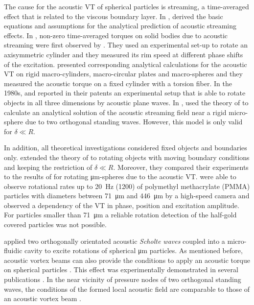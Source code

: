 The cause for the acoustic VT of spherical particles is streaming, a 
time-averaged effect that is related to the viscous boundary layer. In 
\citeyear{Nyborg}, \citeauthor{Nyborg} \cite{Nyborg} derived the basic equations 
and assumptions for the analytical prediction of acoustic streaming effects. In 
\citeyear{Rudnick}, non-zero time-averaged torques on solid bodies due to 
acoustic streaming were first observed by \citeauthor{Rudnick} \cite{Rudnick}. 
They used an experimental set-up to rotate an axisymmetric cylinder and they 
measured its rim speed at different phase shifts of the excitation.  
\citeauthor{Busse} \cite{Busse} presented corresponding analytical calculations 
for the acoustic VT on rigid macro-cylinders, macro-circular plates and 
macro-spheres and they measured the acoustic torque on a fixed cylinder with a 
torsion fiber. In the 1980s, \citeauthor{USpat1} \cite{USpat1,USpat2} and 
\citeauthor{USpat} \cite{USpat} reported in their patents an experimental setup 
that is able to rotate objects in all three dimensions by acoustic plane waves.  
In \citeyear{Wang}, \citeauthor{Wang} \cite{Wang} used the theory of 
\citeauthor{Nyborg} to calculate an analytical solution of the acoustic 
streaming field near a rigid micro-sphere due to two orthogonal standing waves.  
However, this model is only valid for $\delta \ll R$.

In addition, all theoretical investigations considered fixed objects and 
boundaries only.  \citeauthor{Lamprecht} \cite{Lamprecht} extended the theory of 
\citeauthor{Nyborg} to rotating objects with moving boundary conditions and 
keeping the restriction of $\delta \ll R$. Moreover, they compared their 
experiments to the results of \citeauthor{Wang} for rotating 
\si{\micro\meter}-spheres due to the acoustic VT\@.  \citeauthor{Lamprecht} were 
able to observe rotational rates up to \SI{20}{\hertz} (\SI{1200}{\rpm}) of 
polymethyl methacrylate (PMMA) particles with diameters between 
\SI{71}{\micro\meter} and \SI{446}{\micro\meter} by a high-speed camera and 
observed a dependency of the VT in phase, position and excitation amplitude.  
For particles smaller than \SI{71}{\micro\meter} a reliable rotation detection 
of the half-gold covered particles was not possible.

\citeauthor{aubert2016simple} \cite{aubert2016simple} applied two orthogonally 
orientated acoustic \emph{Scholte waves} \cite{Cegla2005} coupled into a 
micro-fluidic cavity to excite rotations of spherical \si{\micro\meter} 
particles. As mentioned before, acoustic vortex beams can also provide the 
conditions to apply an acoustic torque on spherical particles 
\cite{marston2016unphysical}. This effect was experimentally demonstrated in 
several publications \cite{hefner1999acoustical, volke2008transfer, 
demore2012mechanical}. In the near vicinity of pressure nodes of two orthogonal 
standing waves, the conditions of the formed local acoustic field are comparable 
to those of an acoustic vortex beam \cite{zhang2014acoustic}.

